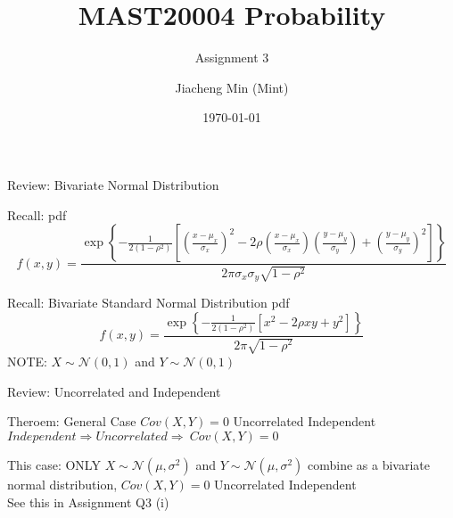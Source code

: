 \documentclass{beamer}
\title{MAST20004 Probability}
\subtitle{Assignment 3}
\author{Jiacheng Min (Mint)}
\institute{HD Education}
\date{\today}
\begin{document}

\frame{\titlepage}


\begin{frame}{Review:  Bivariate  Normal Distribution}

\begin{block}{Recall: pdf}
\[
f(x,y)=\frac{\exp \left\{ -\frac 1{2(1-\rho ^2)}\left[ \left( \frac{x-\mu _x%
}{\sigma _x}\right) ^2-2\rho \left( \frac{x-\mu _x}{\sigma _x}\right) \left( 
\frac{y-\mu _y}{\sigma _y}\right) +\left( \frac{y-\mu _y}{\sigma _y}\right)
^2\right] \right\} }{2\pi \sigma _x\sigma _y\sqrt{1-\rho ^2}} 
\]
\end{block}

\begin{block}{Recall: Bivariate Standard Normal Distribution pdf}
\[
f(x,y)=\frac{\exp \left\{ -\frac 1{2(1-\rho ^2)}\left[ {x
} ^2-2\rho {x}{y} +{y}
^2\right] \right\} }{2\pi\sqrt{1-\rho ^2}} 
\]
NOTE: $X \sim \mathcal{N}(0,1)$ and $Y \sim \mathcal{N}(0,1)$
\end{block}
\end{frame}

\begin{frame}{Review: Uncorrelated and Independent}
\begin{block}{Theroem: General Case}
    $Cov(X, Y) = 0$ \Rightarrow Uncorrelated \nRightarrow Independent
    \\$ Independent \Rightarrow Uncorrelated \Rightarrow \ Cov(X, Y) = 0$
\end{block}

This case: \alert{ONLY} $X \sim \mathcal{N}(\mu,\sigma ^2)$ and $Y \sim \mathcal{N}(\mu,\sigma ^2)$ combine as a bivariate normal distribution,  $Cov(X, Y) = 0$ \Rightarrow Uncorrelated \alert{\Rightarrow Independent}
\\See this in Assignment Q3 (i)
\end{frame}
\end{document}
